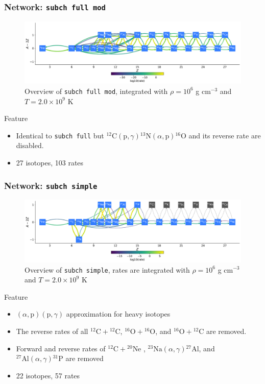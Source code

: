 \documentclass[
	11pt, %
]{beamer}
\begin{document}
\begin{frame}
\frametitle{Network: {\tt subch full mod}}
    \begin{figure}
        \centering
        \includegraphics[width=1\linewidth]{subch_full_mod.pdf}
        \caption{Overview of {\tt subch full mod}, integrated with $\rho = 10^6$ g $\mathrm{cm}^{-3}$ and $T = 2.0 \times 10^9$ K}
    \end{figure}
    \begin{block}{Feature}
        \begin{itemize}
            \item Identical to {\tt subch full} but ${}^{12}\mbox{C}(\mbox{p}, \gamma) {}^{13}\mbox{N}(\alpha, \mbox{p}){}^{16}\mbox{O}$ and its reverse rate are disabled.
            \item 27 isotopes, 103 rates
        \end{itemize}
    \end{block}
\end{frame}


\begin{frame}
\frametitle{Network: {\tt subch simple}}
\begin{figure}
    \centering
    \includegraphics[width=1\linewidth]{subch_simple.pdf}
    \caption{\scriptsize Overview of {\tt subch simple}, rates are integrated with $\rho = 10^6$ g $\mathrm{cm}^{-3}$ and $T = 2.0 \times 10^9$ K}
\end{figure}
\begin{block}{Feature}
    \begin{itemize}
        \item \footnotesize $(\alpha, \mbox{p})(\mbox{p}, \gamma)$ approximation for heavy isotopes
        \item \footnotesize The reverse rates of all ${}^{12}\mbox{C} + {}^{12}\mbox{C}$,  ${}^{16}\mbox{O} + {}^{16}\mbox{O}$, and ${}^{16}\mbox{O} + {}^{12}\mbox{C}$ are removed.
        \item \footnotesize Forward and reverse rates of ${}^{12}\mbox{C} + {}^{20}\mbox{Ne}$ , ${}^{23}\mbox{Na}(\alpha, \gamma){}^{27}\mbox{Al}$, and ${}^{27}\mbox{Al}(\alpha, \gamma){}^{31}\mbox{P}$ are removed
        \item 22 isotopes, 57 rates
    \end{itemize}
\end{block}
\end{frame}
\end{document}
